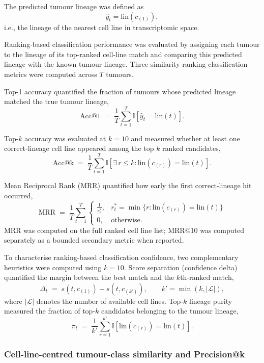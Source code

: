 The predicted tumour lineage was defined as
\[
\hat{y}_t = \mathrm{lin}\!\left(c_{(1)}\right),
\]
i.e., the lineage of the nearest cell line in transcriptomic space.

Ranking-based classification performance was evaluated by assigning each tumour to the lineage of its top-ranked cell-line match and comparing this predicted lineage with the known tumour lineage. Three similarity-ranking classification metrics
were computed across $T$ tumours.

Top-1 accuracy quantified the fraction of tumours whose predicted lineage matched the true tumour lineage,
\[
\mathrm{Acc@1} \;=\; \frac{1}{T}\sum_{t=1}^{T}
\mathbb{I}\!\left[\hat{y}_t=\mathrm{lin}(t)\right].
\]

Top-$k$ accuracy was evaluated at \(k=10\) and measured whether at least one correct-lineage cell line appeared among the top $k$ ranked candidates,
\[
\mathrm{Acc@k} \;=\; \frac{1}{T}\sum_{t=1}^{T}
\mathbb{I}\!\left[\exists\, r\le k:\mathrm{lin}\!\left(c_{(r)}\right)=\mathrm{lin}(t)\right].
\]

Mean Reciprocal Rank (MRR) quantified how early the first correct-lineage hit occurred,
\[
\mathrm{MRR} \;=\; \frac{1}{T}\sum_{t=1}^{T}
\begin{cases}
\frac{1}{r^\ast_t}, & r^\ast_t=\min\{r : \mathrm{lin}(c_{(r)})=\mathrm{lin}(t)\} \\
0, & \text{otherwise}.
\end{cases}
\]
MRR was computed on the full ranked cell line list; MRR@10 was computed separately as a bounded secondary metric when reported.

To characterise ranking-based classification confidence, two complementary heuristics were computed using \(k=10\).
Score separation (confidence delta) quantified the margin between the best match and the $k$th-ranked match,
\[
\Delta_t \;=\; s\!\left(t,c_{(1)}\right) - s\!\left(t,c_{(k')}\right),
\qquad
k'=\min(k,|\mathcal{L}|),
\]
where $|\mathcal{L}|$ denotes the number of available cell lines. Top-$k$ lineage purity measured the fraction
of top-$k$ candidates belonging to the tumour lineage,
\[
\pi_t \;=\; \frac{1}{k'}\sum_{r=1}^{k'}
\mathbb{I}\!\left[\mathrm{lin}\!\left(c_{(r)}\right)=\mathrm{lin}(t)\right].
\]

\subsubsection{Cell-line-centred tumour-class similarity and Precision@k}

